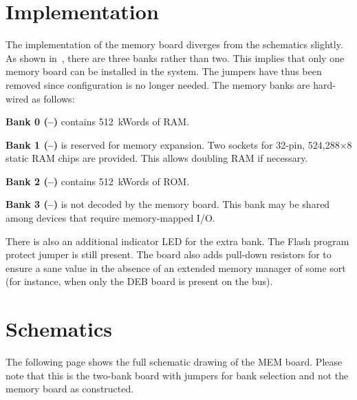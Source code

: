 \section{Implementation}

The implementation of the memory board diverges from the schematics
slightly. As shown in~, there are three banks
rather than two. This implies that only one memory board can be
installed in the system. The jumpers have thus been removed since
configuration is no longer needed. The memory banks are hard-wired as
follows:

\begin{description}
  \item{\bfseries Bank 0 (–)} contains
    512~kWords of RAM.
  \item{\bfseries Bank 1 (–)} is reserved for
    memory expansion. Two sockets for 32-pin, 524,288×8 static RAM
    chips are provided. This allows doubling RAM if necessary.
  \item{\bfseries Bank 2 (–)} contains
    512~kWords of ROM.
  \item{\bfseries Bank 3 (–)} is not decoded
    by the memory board. This bank may be shared among devices that
    require memory-mapped I/O.
\end{description}

There is also an additional indicator LED for the extra bank. The
Flash program protect jumper is still present. The board also adds
pull-down resistors for  to ensure a sane value in the
absence of an extended memory manager of some sort (for instance, when
only the \gls{DEB} board is present on the bus).

\section{Schematics}

The following page shows the full schematic drawing of the \gls{MEM}
board. Please note that this is the two-bank board with jumpers for
bank selection and not the memory board as constructed.

\cleardoublepage
{}
